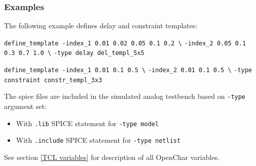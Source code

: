 \documentclass[12pt, a4paper]{article}
\begin{document}
\subsubsection*{Examples}

The following example defines delay and constraint templates:

\texttt{define_template -index_1 {0.01 0.02 0.05 0.1 0.2} \textbackslash}\newline
\hspace*{3.5cm}\texttt{-index_2 {0.05 0.1 0.3 0.7 1.0} \textbackslash}\newline
\hspace*{3.5cm}\texttt{-type delay del_templ_5x5} \newline

\texttt{define_template -index_1 {0.01 0.1 0.5} \textbackslash}\newline
\hspace*{3.5cm}\texttt{-index_2 {0.01 0.1 0.5} \textbackslash}\newline
\hspace*{3.5cm}\texttt{-type constraint constr_templ_3x3} \newline







The spice files are included in the simulated analog testbench based on \texttt{-type}
argument set:
\begin{itemize}
    \item{With \texttt{.lib} SPICE statement for \texttt{-type model}}
    \item{With \texttt{.include} SPICE statement for \texttt{-type netlist}}
\end{itemize}




See section \ref{TCL variables} for description of all OpenChar variables.



\end{document}
